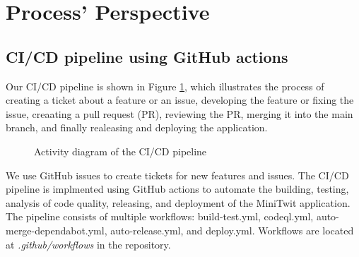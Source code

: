\section{Process' Perspective}
\label{ch:background} 

\subsection{CI/CD pipeline using GitHub actions}
Our CI/CD pipeline is shown in Figure \ref{fig:activity_diagram}, which illustrates the process 
of creating a ticket about a feature or an issue,
developing the feature or fixing the issue, creaating a pull request (PR),
reviewing the PR, merging it into the main branch, and finally realeasing and deploying the application.
\begin{figure}[h]
      \centering
      \caption{Activity diagram of the CI/CD pipeline}
      \label{fig:activity_diagram}
\end{figure}

We use GitHub issues to create tickets for new features and issues.
The CI/CD pipeline is implmented using GitHub actions to automate the
building, testing, analysis of code quality, releasing, and deployment
of the MiniTwit application.
The pipeline consists of multiple workflows: build-test.yml, codeql.yml, auto-merge-dependabot.yml, auto-release.yml, and deploy.yml. 
Workflows are located at \textit{.github/workflows} in the repository. 

